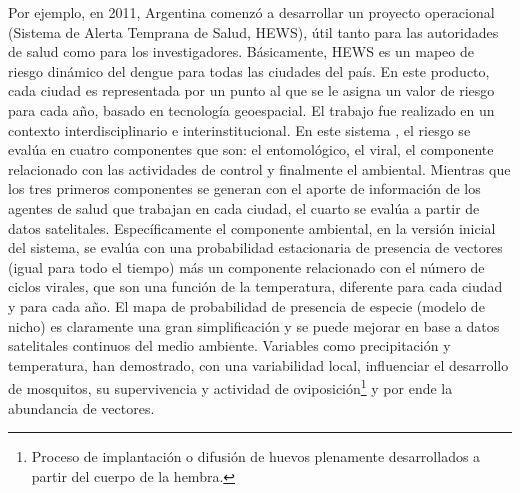 \par Por ejemplo, en 2011, Argentina comenzó a desarrollar un proyecto operacional
  (Sistema de Alerta Temprana de Salud, HEWS), útil tanto para las autoridades de
  salud como para los investigadores.
  Básicamente, HEWS es un mapeo de riesgo dinámico del dengue para todas las
  ciudades del país. En este producto, cada ciudad es representada por un punto
  al que se le asigna un valor de riesgo para cada año, basado en tecnología
  geoespacial. El trabajo fue realizado en un contexto interdisciplinario e
  interinstitucional. En este sistema \cite{porcasi_operative}, el riesgo se evalúa en cuatro componentes que son: el
  entomológico, el viral, el componente relacionado con las actividades de
  control y finalmente el ambiental. Mientras que los tres primeros componentes
  se generan con el aporte de información de los agentes de salud que trabajan en cada
  ciudad, el cuarto se evalúa a partir de datos satelitales.
  Específicamente el componente ambiental, en la versión inicial del sistema, se
  evalúa con una probabilidad estacionaria de presencia de vectores (igual para
  todo el tiempo) más un componente relacionado con el número de ciclos virales,
  que son una función de la temperatura, diferente para cada ciudad y
  para cada año. El mapa de probabilidad de presencia de especie (modelo de nicho)
  es claramente una gran simplificación y se puede mejorar en base a datos
  satelitales continuos del medio ambiente. Variables como precipitación y
  temperatura, han demostrado, con una variabilidad local, influenciar el
  desarrollo de mosquitos, su supervivencia y actividad de
  oviposición\footnote{Proceso de implantación o difusión de huevos plenamente
  desarrollados a partir del cuerpo de la hembra.} y por ende la abundancia de vectores.

